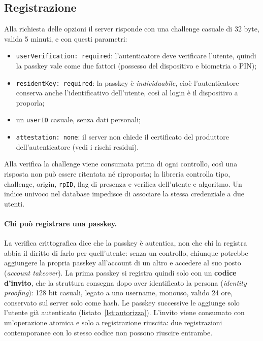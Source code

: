 \subsection{Registrazione}
Alla richiesta delle opzioni il server risponde con una challenge casuale di 32 byte, valida 5 minuti, e con questi parametri:
\begin{itemize}
  \item \texttt{userVerification: required}: l'autenticatore deve verificare l'utente, quindi la passkey vale come due fattori (possesso del dispositivo e biometria o PIN);
  \item \texttt{residentKey: required}: la passkey è \emph{individuabile}, cioè l'autenticatore conserva anche l'identificativo dell'utente, così al login è il dispositivo a proporla;
  \item un \texttt{userID} casuale, senza dati personali;
  \item \texttt{attestation: none}: il server non chiede il certificato del produttore dell'autenticatore (vedi i rischi residui).
\end{itemize}
Alla verifica la challenge viene consumata prima di ogni controllo, così una risposta non può essere ritentata né riproposta; la libreria controlla tipo, challenge, origin, \texttt{rpID}, flag di presenza e verifica dell'utente e algoritmo. Un indice univoco nel database impedisce di associare la stessa credenziale a due utenti.

\paragraph{Chi può registrare una passkey.} La verifica crittografica dice che la passkey è autentica, non che chi la registra abbia il diritto di farlo per quell'utente: senza un controllo, chiunque potrebbe aggiungere la propria passkey all'account di un altro e accedere al suo posto (\emph{account takeover}). La prima passkey si registra quindi solo con un \textbf{codice d'invito}, che la struttura consegna dopo aver identificato la persona (\emph{identity proofing}): 128 bit casuali, legato a uno username, monouso, valido 24 ore, conservato sul server solo come hash. Le passkey successive le aggiunge solo l'utente già autenticato (listato~\ref{lst:autorizza}). L'invito viene consumato con un'operazione atomica e solo a registrazione riuscita: due registrazioni contemporanee con lo stesso codice non possono riuscire entrambe.


